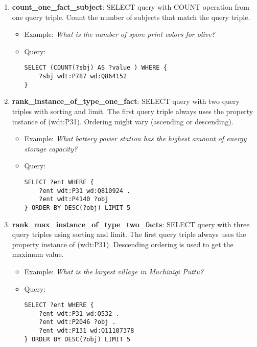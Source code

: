 \begin{enumerate}
    \item \textbf{count\_one\_fact\_subject}: SELECT query with COUNT operation from one query triple. 
    Count the number of subjects that match the query triple.
    \begin{itemize}
        \item Example: \textit{What is the number of spore print colors for olive?}
        \item Query:
        \begin{lstlisting}[basicstyle=\ttfamily,frame=single]        
SELECT (COUNT(?sbj) AS ?value ) WHERE { 
    ?sbj wdt:P787 wd:Q864152 
}
        \end{lstlisting}
    \end{itemize}

    \item \textbf{rank\_instance\_of\_type\_one\_fact}: SELECT query with two query triples with 
    sorting and limit. The first query triple always uses the property instance of (wdt:P31). 
    Ordering might vary (ascending or descending).
    \begin{itemize}
        \item Example: \textit{What battery power station has the highest amount of energy storage 
        capacity?}
        \item Query:
        \begin{lstlisting}[basicstyle=\ttfamily,frame=single]        
SELECT ?ent WHERE { 
    ?ent wdt:P31 wd:Q810924 . 
    ?ent wdt:P4140 ?obj 
} ORDER BY DESC(?obj) LIMIT 5
        \end{lstlisting}
    \end{itemize}
    
    \item \textbf{rank\_max\_instance\_of\_type\_two\_facts}: SELECT query with three query triples using 
    sorting and limit. The first query triple always uses the property instance of (wdt:P31). 
    Descending ordering is used to get the maximum value.
    \begin{itemize}
        \item Example: \textit{What is the largest village in Muchinigi Puttu?}
        \item Query:
        \begin{lstlisting}[basicstyle=\ttfamily,frame=single]        
SELECT ?ent WHERE { 
    ?ent wdt:P31 wd:Q532 . 
    ?ent wdt:P2046 ?obj . 
    ?ent wdt:P131 wd:Q11107378 
} ORDER BY DESC(?obj) LIMIT 5
        \end{lstlisting}
    \end{itemize}
    

\end{enumerate}

